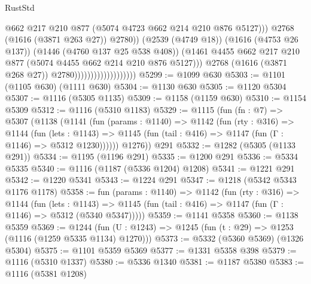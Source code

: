 \begin{lexlean}{RustStd}
\begin{coremodule}
                                                    @662
                                                    @217
                                                    @210
                                                    @877
                                                    (@5074 @4723 @662 @214 @210 @876 @5127)))
                                                @2768
                                                (@1616 (@3871 @263 @27))
                                                @2780))
                                            (@2539 (@4749 @18))
                                            (@1616 (@4753 @26 @137))
                                            (@1446 (@4760 @137 @25 @538 @408))
                                            (@1461
                                              @4455
                                              @662
                                              @217
                                              @210
                                              @877
                                              (@5074 @4455 @662 @214 @210 @876 @5127)))
                                          @2768
                                          (@1616 (@3871 @268 @27))
                                          @2780)))))))))))))))))))
@5299 := @1099 @630
@5303 := @1101 (@1105 @630) (@1111 @630)
@5304 := @1130 @630
@5305 := @1120 @5304
@5307 := @1116 (@5305 @1135)
@5309 := @1158 (@1159 @630)
@5310 := @1154 @5309
@5312 := @1116 (@5310 @1183)
@5329 := @1115
    (fun (fn : @7) =>
    @5307
      (@1138
        (@1141
          (fun (params : @1140) =>
          @1142
            (fun (rty : @316) =>
            @1144
              (fun (lets : @1143) =>
              @1145 (fun (tail : @416) => @1147 (fun (Γ : @1146) => @5312 @1230))))))
        @1276))
    @291
@5332 := @1282 (@5305 (@1133 @291))
@5334 := @1195 (@1196 @291)
@5335 := @1200 @291
@5336 := @5334 @5335
@5340 := @1116 (@1187 (@5336 @1204) @1208)
@5341 := @1221 @291
@5342 := @1220 @5341
@5343 := @1224 @291
@5347 := @1218 (@5342 @5343 @1176 @1178)
@5358 := fun (params : @1140) =>
  @1142
    (fun (rty : @316) =>
    @1144
      (fun (lets : @1143) =>
      @1145 (fun (tail : @416) => @1147 (fun (Γ : @1146) => @5312 (@5340 @5347)))))
@5359 := @1141 @5358
@5360 := @1138 @5359
@5369 := @1244 (fun (U : @1243) => @1245 (fun (t : @29) => @1253 (@1116 (@1259 @5335 @1134) @1270)))
@5373 := @5332 (@5360 @5369) (@1326 @5304)
@5375 := @1101 @5359 @5369
@5377 := @1331 @5358 @398
@5379 := @1116 (@5310 @1337)
@5380 := @5336 @1340
@5381 := @1187 @5380
@5383 := @1116 (@5381 @1208)

\end{coremodule}
\end{lexlean}

